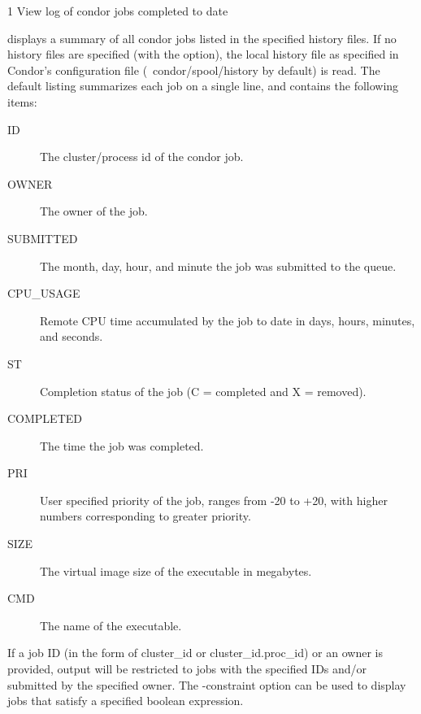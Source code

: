 \begin{ManPage}{\label{man-condor-history}}{1}
{View log of condor jobs completed to date}
\Synopsis {}
  

\Description
{} displays a summary of all condor jobs listed in the
specified history files.  If no history files are specified (with the  option), the local
history file as specified in Condor's configuration file
(~condor/spool/history by default) is read.  The default listing
summarizes each job on a single line, and  contains the following items:


\begin{description}
\item[ID] The cluster/process id of the condor job. 
\item[OWNER] The owner of the job. 
\item[SUBMITTED] The month, day, hour, and minute the job was submitted to the queue. 
\item[CPU\_USAGE] Remote CPU time accumulated by the job to date in days, hours, minutes, and seconds.
\item[ST] Completion status of the job (C = completed and X = removed).
\item[COMPLETED] The time the job was completed.
\item[PRI] User specified priority of the job, ranges from -20 to +20, with higher numbers corresponding to greater priority. 
\item[SIZE] The virtual image size of the executable in megabytes. 
\item[CMD] The name of the executable. 
\end{description}

If a job ID (in the form of cluster\_id or cluster\_id.proc\_id) or an
owner is provided, output will be restricted to jobs with the
specified IDs and/or submitted by the specified owner.  
The -constraint option can be used to display jobs that satisfy a
specified boolean expression.

\begin{Options}
\end{Options}

\end{ManPage}
